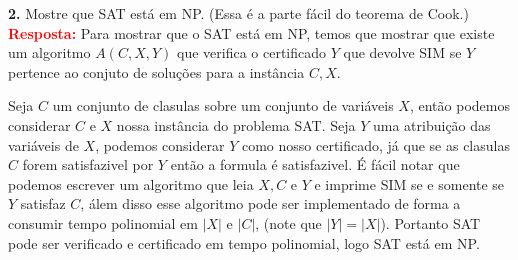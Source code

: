 
\noindent\textbf{2.} Mostre que SAT está em NP. (Essa é a parte fácil do teorema de Cook.)\\[6pt]
\textcolor{red}{\textbf{Resposta:}} Para mostrar que o SAT está em NP, temos que mostrar que existe um algoritmo $A(C,X,Y)$ que verifica o certificado $Y$ que devolve SIM se $Y$ pertence ao conjuto de soluções para a instância $C, X$.

Seja $C$ um conjunto de clasulas sobre um conjunto de variáveis $X$, então podemos considerar $C$ e $X$  nossa instância do problema SAT. Seja $Y$ uma atribuição das variáveis de $X$, podemos considerar $Y$ como nosso certificado, já que se as clasulas $C$ forem satisfazivel por $Y$ então a formula é satisfazivel. É fácil notar que podemos escrever um algoritmo que leia $X,C$ e $Y$ e imprime SIM se e somente se $Y$ satisfaz $C$, álem disso esse algoritmo pode ser implementado de forma a consumir tempo polinomial em $|X|$ e $|C|$, (note que $|Y| = |X|$). Portanto SAT pode ser verificado e certificado em tempo polinomial, logo SAT está em NP.